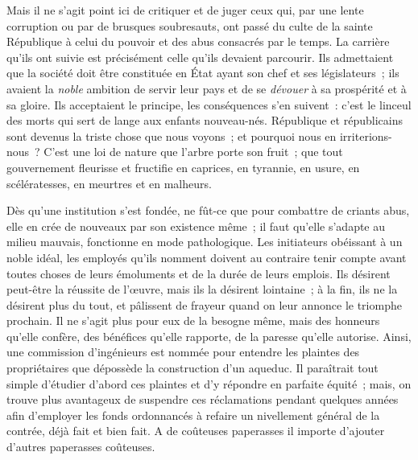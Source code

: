 \documentclass[french,twoside]{book} %
\begin{document}
Mais il ne s’agit point ici de critiquer et de juger ceux qui, par une lente corruption ou par de brusques soubresauts, ont passé du culte de la sainte République à celui du pouvoir et des abus consacrés par le temps. La carrière qu’ils  ont suivie est précisément celle qu’ils devaient parcourir. Ils admettaient que la société doit être constituée en État ayant son chef et ses législateurs ; ils avaient la \emph{noble} ambition de servir leur pays et de se \emph{dévouer} à sa prospérité et à sa gloire. Ils acceptaient le principe, les conséquences s’en suivent : c’est le linceul des morts qui sert de lange aux enfants nouveau-nés. République et républicains sont devenus la triste chose que nous voyons ; et pourquoi nous en irriterions-nous ? C’est une loi de nature que l’arbre porte son fruit ; que tout gouvernement fleurisse et fructifie en caprices, en tyrannie, en usure, en scélératesses, en meurtres et en malheurs.\par
Dès qu’une institution s’est fondée,  ne fût-ce que pour combattre de criants abus, elle en crée de nouveaux par son existence même ; il faut qu’elle s’adapte au milieu mauvais, fonctionne en mode pathologique. Les initiateurs obéissant à un noble idéal, les employés qu’ils nomment doivent au contraire tenir compte avant toutes choses de leurs émoluments et de la durée de leurs emplois. Ils désirent peut-être la réussite de l’œuvre, mais ils la désirent lointaine ; à la fin, ils ne la désirent plus du tout, et pâlissent de frayeur quand on leur annonce le triomphe prochain. Il ne s’agit plus pour eux de la besogne même, mais des honneurs qu’elle confère, des bénéfices qu’elle rapporte, de la paresse qu’elle autorise. Ainsi, une commission d’ingénieurs est nommée pour entendre  les plaintes des propriétaires que dépossède la construction d’un aqueduc. Il paraîtrait tout simple d’étudier d’abord ces plaintes et d’y répondre en parfaite équité ; mais, on trouve plus avantageux de suspendre ces réclamations pendant quelques années afin d’employer les fonds ordonnancés à refaire un nivellement général de la contrée, déjà fait et bien fait. A de coûteuses paperasses il importe d’ajouter d’autres paperasses coûteuses.\par
\end{document}
